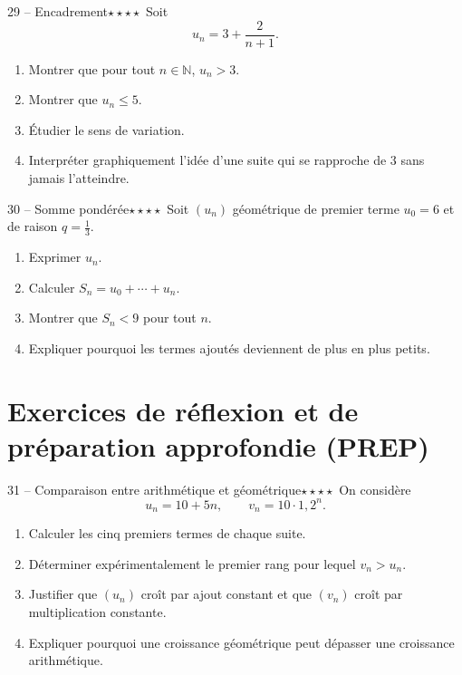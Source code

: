 \documentclass[11pt,a4paper]{article}
\newcommand{\N}{\mathbb{N}}
\newcommand{\quatreetoiles}{\(\star\star\star\star\)}
\begin{document}
\begin{exobox}{29 -- Encadrement}{\quatreetoiles}
Soit
\[
u_n=3+\frac{2}{n+1}.
\]
\begin{enumerate}[label=\alph*)]
  \item Montrer que pour tout \(n\in\N\), \(u_n>3\).
  \item Montrer que \(u_n\leq 5\).
  \item Étudier le sens de variation.
  \item Interpréter graphiquement l'idée d'une suite qui se rapproche de \(3\) sans jamais l'atteindre.
\end{enumerate}
\end{exobox}

\begin{exobox}{30 -- Somme pondérée}{\quatreetoiles}
Soit \((u_n)\) géométrique de premier terme \(u_0=6\) et de raison \(q=\frac13\).
\begin{enumerate}[label=\alph*)]
  \item Exprimer \(u_n\).
  \item Calculer \(S_n=u_0+\cdots+u_n\).
  \item Montrer que \(S_n<9\) pour tout \(n\).
  \item Expliquer pourquoi les termes ajoutés deviennent de plus en plus petits.
\end{enumerate}
\end{exobox}

\section{Exercices de réflexion et de préparation approfondie (PREP)}

\begin{exobox}{31 -- Comparaison entre arithmétique et géométrique}{\quatreetoiles}
On considère
\[
u_n=10+5n,\qquad v_n=10\cdot 1{,}2^n.
\]
\begin{enumerate}[label=\alph*)]
  \item Calculer les cinq premiers termes de chaque suite.
  \item Déterminer expérimentalement le premier rang pour lequel \(v_n>u_n\).
  \item Justifier que \((u_n)\) croît par ajout constant et que \((v_n)\) croît par multiplication constante.
  \item Expliquer pourquoi une croissance géométrique peut dépasser une croissance arithmétique.
\end{enumerate}
\end{exobox}
\end{document}
